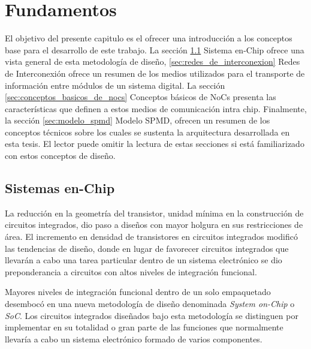 
\chapter{Fundamentos}
	\label{chap:fundamentos}

El objetivo del presente capitulo es el ofrecer una introducción a los conceptos base para el desarrollo de este trabajo. La sección \ref{sec:sistemas_en_chip} Sistema en-Chip ofrece una vista general de esta metodología de diseño, \ref{sec:redes_de_interconexion} Redes de Interconexión ofrece un resumen de los medios utilizados para el transporte de información entre módulos de un sistema digital. La sección \ref{sec:conceptos_basicos_de_nocs} Conceptos básicos de NoCs presenta las características que definen a estos medios de comunicación intra chip. Finalmente, la sección \ref{sec:modelo_spmd} Modelo SPMD, ofrecen un resumen de los conceptos técnicos sobre los cuales se sustenta la arquitectura desarrollada en esta tesis. El lector puede omitir la lectura de estas secciones si está familiarizado con estos conceptos de diseño.

\section{Sistemas en-Chip}\label{sec:sistemas_en_chip}

La reducción en la geometría del transistor, unidad mínima en la construcción de circuitos integrados, dio paso a diseños con mayor holgura en sus restricciones de área. El incremento en densidad de transistores en circuitos integrados modificó las tendencias de diseño, donde en lugar de favorecer circuitos integrados que llevarán a cabo una tarea particular dentro de un sistema electrónico se dio preponderancia a circuitos con altos niveles de integración funcional.

Mayores niveles de integración funcional dentro de un solo empaquetado desembocó en una nueva metodología de diseño denominada \textit{System on-Chip} o \textit{SoC}\cite{chapter1:Perry:1989:ISO:66234.66236, chapter1:542273, chapter1:632878}. Los circuitos integrados diseñados bajo esta metodología se distinguen por implementar en su totalidad o gran parte de las funciones que normalmente llevaría a cabo un sistema electrónico formado de varios componentes.

